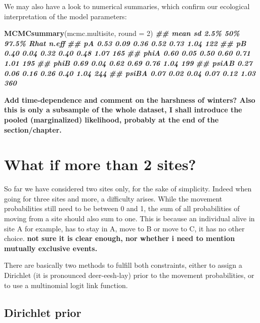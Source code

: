 \documentclass[
  12pt,
]{krantz}
\newenvironment{Shaded}{\begin{snugshade}}{\end{snugshade}}
\newcommand{\AttributeTok}[1]{\textcolor[rgb]{0.13,0.29,0.53}{#1}}
\newcommand{\DecValTok}[1]{\textcolor[rgb]{0.00,0.00,0.81}{#1}}
\newcommand{\DocumentationTok}[1]{\textcolor[rgb]{0.56,0.35,0.01}{\textbf{\textit{#1}}}}
\newcommand{\FunctionTok}[1]{\textcolor[rgb]{0.13,0.29,0.53}{\textbf{#1}}}
\newcommand{\NormalTok}[1]{#1}
\begin{document}
We may also have a look to numerical summaries, which confirm our ecological interpretation of the model parameters:

\begin{Shaded}
\begin{Highlighting}[]
\FunctionTok{MCMCsummary}\NormalTok{(mcmc.multisite, }\AttributeTok{round =} \DecValTok{2}\NormalTok{)}
\DocumentationTok{\#\#       mean   sd 2.5\%  50\% 97.5\% Rhat n.eff}
\DocumentationTok{\#\# pA    0.53 0.09 0.36 0.52  0.73 1.04   122}
\DocumentationTok{\#\# pB    0.40 0.04 0.32 0.40  0.48 1.07   165}
\DocumentationTok{\#\# phiA  0.60 0.05 0.50 0.60  0.71 1.01   195}
\DocumentationTok{\#\# phiB  0.69 0.04 0.62 0.69  0.76 1.04   199}
\DocumentationTok{\#\# psiAB 0.27 0.06 0.16 0.26  0.40 1.04   244}
\DocumentationTok{\#\# psiBA 0.07 0.02 0.04 0.07  0.12 1.03   360}
\end{Highlighting}
\end{Shaded}

\textbf{Add time-dependence and comment on the harshness of winters? Also this is only a subsample of the whole dataset, I shall introduce the pooled (marginalized) likelihood, probably at the end of the section/chapter.}

\hypertarget{what-if-more-than-2-sites}{%
\section{What if more than 2 sites?}\label{what-if-more-than-2-sites}}

So far we have considered two sites only, for the sake of simplicity. Indeed when going for three sites and more, a difficulty arises. While the movement probabilities still need to be between 0 and 1, the sum of all probabilities of moving from a site should also sum to one. This is because an individual alive in site A for example, has to stay in A, move to B or move to C, it has no other choice. \textbf{not sure it is clear enough, nor whether i need to mention mutually exclusive events.}

There are basically two methods to fulfill both constraints, either to assign a Dirichlet (it is pronounced deer-eesh-lay) prior to the movement probabilities, or to use a multinomial logit link function.

\hypertarget{dirichlet-prior}{%
\subsection{Dirichlet prior}\label{dirichlet-prior}}
\end{document}
